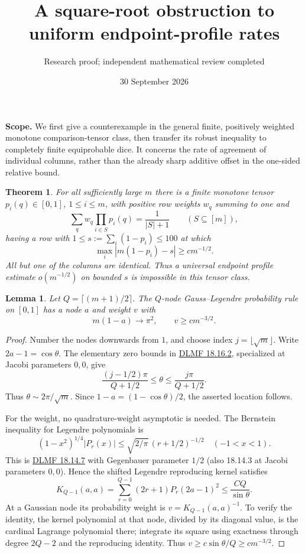 \documentclass[11pt]{article}
\title{A square-root obstruction to uniform endpoint-profile rates}
\author{Research proof; independent mathematical review completed}
\date{30 September 2026}
\newtheorem{theorem}{Theorem}
\newtheorem{lemma}{Lemma}
\begin{document}
\maketitle
\noindent\textbf{Scope.} We first give a counterexample in the general
finite, positively weighted monotone comparison-tensor class, then
transfer its robust inequality to completely finite equiprobable dice.
It concerns the rate of agreement of individual columns, rather than
the already sharp additive offset in the one-sided relative bound.

\begin{theorem}\label{main}
For all sufficiently large $m$ there is a finite monotone tensor
$p_i(q)\in[0,1]$, $1\le i\le m$, with positive row weights $w_q$
summing to one and
\[
 \sum_qw_q\prod_{i\in S}p_i(q)=\frac1{|S|+1}
                      \qquad(S\subseteq[m]),
\]
having a row with $1\le s:=\sum_i(1-p_i)\le100$ at which
\[
 \max_i|m(1-p_i)-s|\ge c m^{-1/2}.
\]
All but one of the columns are identical. Thus a universal endpoint
profile estimate $o(m^{-1/2})$ on bounded $s$ is impossible in this
tensor class.
\end{theorem}

\begin{lemma}\label{gauss}
Let $Q=\lceil(m+1)/2\rceil$. The $Q$-node Gauss--Legendre probability
rule on $[0,1]$ has a node $a$ and weight $v$ with
\[
 m(1-a)\longrightarrow\pi^2,\qquad v\ge c m^{-3/2}.
\]
\end{lemma}
\begin{proof}
Number the nodes downwards from $1$, and choose index
$j=\lfloor\sqrt m\rfloor$. Write $2a-1=\cos\theta$.
The elementary zero bounds in
\href{https://dlmf.nist.gov/18.16.E2}{DLMF 18.16.2}, specialized
at Jacobi parameters $0,0$, give
\[
 \frac{(j-1/2)\pi}{Q+1/2}\le\theta
       \le\frac{j\pi}{Q+1/2}.
\]
Thus $\theta\sim2\pi/\sqrt m$.
Since $1-a=(1-\cos\theta)/2$, the
asserted location follows.

For the weight, no quadrature-weight asymptotic is needed.
The Bernstein inequality for Legendre polynomials is
\[
 (1-x^2)^{1/4}|P_r(x)|
 \le \sqrt{2/\pi}\,(r+1/2)^{-1/2}\quad(-1<x<1).
\]
This is \href{https://dlmf.nist.gov/18.14.E7}{DLMF 18.14.7}
with Gegenbauer parameter $1/2$ (also 18.14.3 at Jacobi parameters
$0,0$). Hence the shifted Legendre reproducing kernel satisfies
\[
 K_{Q-1}(a,a)=\sum_{r=0}^{Q-1}(2r+1)P_r(2a-1)^2
                  \le\frac{C Q}{\sin\theta}.
\]
At a Gaussian node its probability weight is
$v=K_{Q-1}(a,a)^{-1}$. To verify the identity, the kernel polynomial
at that node, divided by its diagonal value, is the cardinal
Lagrange polynomial there; integrate its square using exactness
through degree $2Q-2$ and the reproducing identity.
Thus $v\ge c\sin\theta/Q\ge c m^{-3/2}$.
\end{proof}
\end{document}
